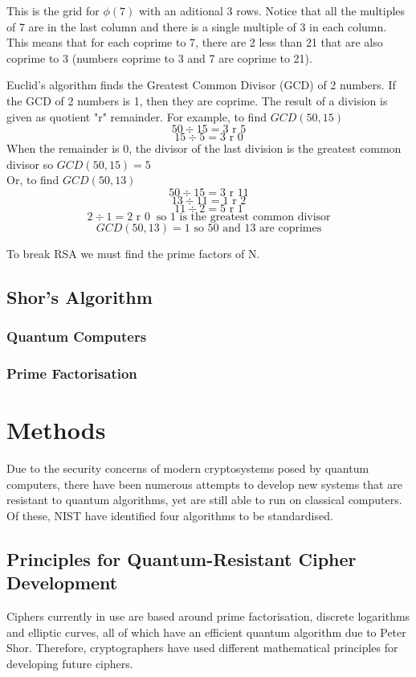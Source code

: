 \documentclass{article}
\begin{document}
This is the grid for \(\phi(7)\) with an aditional 3 rows. Notice that all the
multiples of 7 are in the last column and there is a single multiple of 3 in
each column. This means that for each coprime to 7, there are 2 less than 21
that are also coprime to 3 (numbers coprime to 3 and 7 are coprime to 21).

Euclid's algorithm finds the Greatest Common Divisor (GCD) of 2 numbers. If the
GCD of 2 numbers is 1, then they are coprime.  The result of a division is
given as quotient "r" remainder.
For example, to find \(GCD(50,15)\)
\[
50 \div 15 = 3 \text{ r } 5\]
\[
   15 \div 5 = 3 \text{  r  } 0
\]
When the remainder is 0, the divisor of the last division is the greatest
common divisor so \(GCD(50,15) = 5\)\\

Or, to find \(GCD(50,13)\)
\[50 \div 15 = 3 \text{  r  } 11\]
\[13 \div 11 = 1\text{  r  }2\]
\[11 \div 2 = 5\text{  r  }1\]
\[2 \div 1 = 2\text{  r  }0\ \text{ so 1 is the greatest common divisor}\]
\[GCD(50,13) = 1 \text{  so  } 50 \text{ and } 13 \text{ are coprimes}\]

To break RSA we must find the prime factors of N.


\subsection{Shor's Algorithm}
\subsubsection{Quantum Computers}
\subsubsection{Prime Factorisation}

\section{Methods}
Due to the security concerns of modern cryptosystems posed by quantum
computers, there have been numerous attempts to develop new systems that are
resistant to quantum algorithms, yet are still able to run on classical
computers. Of these, NIST have identified four algorithms to be standardised.

\subsection{Principles for Quantum-Resistant Cipher Development}
Ciphers currently in use are based around prime factorisation, discrete
logarithms and elliptic curves, all of which have an efficient quantum
algorithm due to Peter Shor. Therefore, cryptographers have used different
mathematical principles for developing future ciphers.
\end{document}
